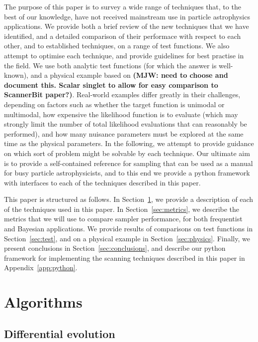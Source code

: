 \documentclass[11pt]{article}
\begin{document}
The purpose of this paper is to survey a wide range of techniques that, to the best of our knowledge, have not received mainstream use in particle astrophysics applications. We provide both a brief review of the new techniques that we have identified, and a detailed comparison of their performace with respect to each other, and to established techniques, on a range of test functions. We also attempt to optimise each technique, and provide guidelines for best practise in the field. We use both analytic test functions (for which the answer is well-known), and a physical example based on {\bf (MJW: need to choose and document this. Scalar singlet to allow for easy comparison to ScannerBit paper?)}. Real-world examples differ greatly in their challenges, depending on factors such as whether the target function is unimodal or multimodal, how expensive the likelihood function is to evaluate (which may strongly limit the number of total likelihood evaluations that can reasonably be performed), and how many nuisance parameters must be explored at the same time as the physical parameters. In the following, we attempt to provide guidance on which sort of problem might be solvable by each technique. Our ultimate aim is to provide a self-contained reference for sampling that can be used as a manual for busy particle astrophysicists, and to this end we provide a python framework with interfaces to each of the techniques described in this paper.

This paper is structured as follows. In Section~\ref{sec:algorithms}, we provide a description of each of the techniques used in this paper. In Section~\ref{sec:metrics}, we describe the metrics that we will use to compare sampler performance, for both frequentist and Bayesian applications. We provide results of comparisons on test functions in Section~\ref{sec:test}, and on a physical example in Section~\ref{sec:physics}. Finally, we present conclusions in Section~\ref{sec:conclusions}, and describe our python framework for implementing the scanning techniques described in this paper in Appendix~\ref{app:python}.

\section{Algorithms}
\label{sec:algorithms}

\subsection{Differential evolution}
\end{document}
